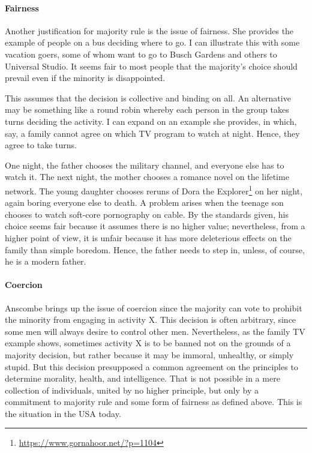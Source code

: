 \paragraph{Fairness}


Another justification for majority rule is the issue of fairness. She provides the example of people on a bus deciding where to go. I can illustrate this with some vacation goers, some of whom want to go to Busch Gardens and others to Universal Studio. It seems fair to most people that the majority's choice should prevail even if the minority is disappointed.

This assumes that the decision is collective and binding on all. An alternative may be something like a round robin whereby each person in the group takes turns deciding the activity. I can expand on an example she provides, in which, say, a family cannot agree on which TV program to watch at night. Hence, they agree to take turns.

One night, the father chooses the military channel, and everyone else has to watch it. The next night, the mother chooses a romance novel on the lifetime network. The young daughter chooses reruns of Dora the Explorer\footnote{\url{https://www.gornahoor.net/?p=1104}} on her night, again boring everyone else to death. A problem arises when the teenage son chooses to watch soft-core pornography on cable. By the standards given, his choice seems fair because it assumes there is no higher value; nevertheless, from a higher point of view, it is unfair because it has more deleterious effects on the family than simple boredom. Hence, the father needs to step in, unless, of course, he is a modern father.

\paragraph{Coercion}


Anscombe brings up the issue of coercion since the majority can vote to prohibit the minority from engaging in activity X. This decision is often arbitrary, since some men will always desire to control other men. Nevertheless, as the family TV example shows, sometimes activity X is to be banned not on the grounds of a majority decision, but rather because it may be immoral, unhealthy, or simply stupid. But this decision presupposed a common agreement on the principles to determine morality, health, and intelligence. That is not possible in a mere collection of individuals, united by no higher principle, but only by a commitment to majority rule and some form of fairness as defined above. This is the situation in the USA today.

